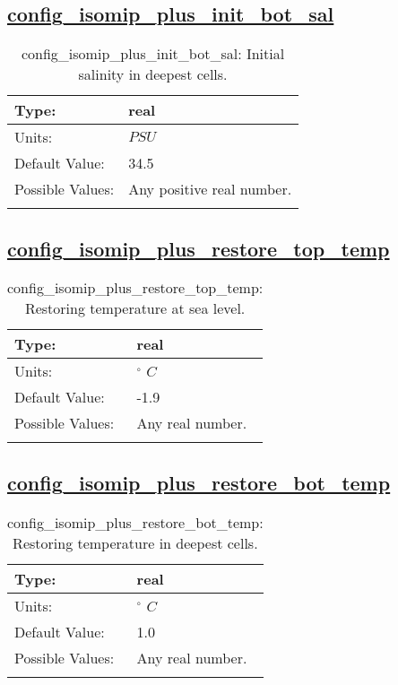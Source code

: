 \subsection[config\_isomip\_plus\_init\_bot\_sal]{\hyperref[sec:nm_tab_isomip_plus]{config\_isomip\_plus\_init\_bot\_sal}}
\label{subsec:nm_sec_config_isomip_plus_init_bot_sal}
\begin{center}
\begin{longtable}{| p{2.0in} || p{4.0in} |}
    \hline
    Type: & real \\
    \hline
    Units: & $PSU$ \\
    \hline
    Default Value: & 34.5 \\
    \hline
    Possible Values: & Any positive real number. \\
    \hline
    \caption{config\_isomip\_plus\_init\_bot\_sal: Initial salinity in deepest cells.}
\end{longtable}
\end{center}
\subsection[config\_isomip\_plus\_restore\_top\_temp]{\hyperref[sec:nm_tab_isomip_plus]{config\_isomip\_plus\_restore\_top\_temp}}
\label{subsec:nm_sec_config_isomip_plus_restore_top_temp}
\begin{center}
\begin{longtable}{| p{2.0in} || p{4.0in} |}
    \hline
    Type: & real \\
    \hline
    Units: & $^\circ$ $C$ \\
    \hline
    Default Value: & -1.9 \\
    \hline
    Possible Values: & Any real number. \\
    \hline
    \caption{config\_isomip\_plus\_restore\_top\_temp: Restoring temperature at sea level.}
\end{longtable}
\end{center}
\subsection[config\_isomip\_plus\_restore\_bot\_temp]{\hyperref[sec:nm_tab_isomip_plus]{config\_isomip\_plus\_restore\_bot\_temp}}
\label{subsec:nm_sec_config_isomip_plus_restore_bot_temp}
\begin{center}
\begin{longtable}{| p{2.0in} || p{4.0in} |}
    \hline
    Type: & real \\
    \hline
    Units: & $^\circ$ $C$ \\
    \hline
    Default Value: & 1.0 \\
    \hline
    Possible Values: & Any real number. \\
    \hline
    \caption{config\_isomip\_plus\_restore\_bot\_temp: Restoring temperature in deepest cells.}
\end{longtable}
\end{center}
